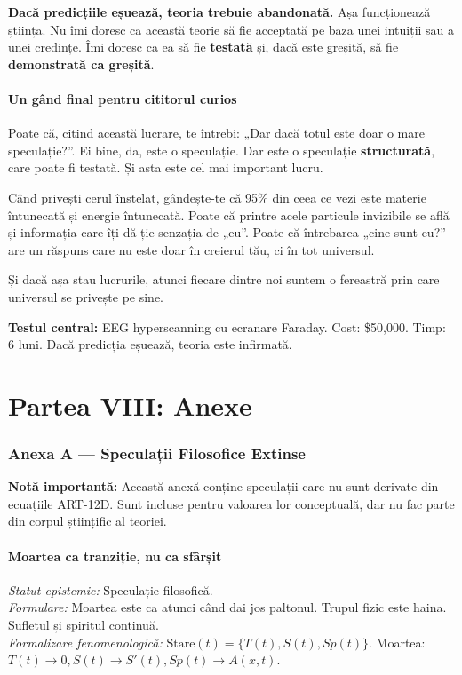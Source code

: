 \documentclass[11pt,a4paper]{article}
\begin{document}
\textbf{Dacă predicțiile eșuează, teoria trebuie abandonată.} Așa funcționează știința. Nu îmi doresc ca această teorie să fie acceptată pe baza unei intuiții sau a unei credințe. Îmi doresc ca ea să fie \textbf{testată} și, dacă este greșită, să fie \textbf{demonstrată ca greșită}.

\subsection{Un gând final pentru cititorul curios}
Poate că, citind această lucrare, te întrebi: „Dar dacă totul este doar o mare speculație?”. Ei bine, da, este o speculație. Dar este o speculație \textbf{structurată}, care poate fi testată. Și asta este cel mai important lucru.

Când privești cerul înstelat, gândește-te că 95\% din ceea ce vezi este materie întunecată și energie întunecată. Poate că printre acele particule invizibile se află și informația care îți dă ție senzația de „eu”. Poate că întrebarea „cine sunt eu?” are un răspuns care nu este doar în creierul tău, ci în tot universul.

Și dacă așa stau lucrurile, atunci fiecare dintre noi suntem o fereastră prin care universul se privește pe sine.

\textbf{Testul central:} EEG hyperscanning cu ecranare Faraday. Cost: \$50,000. Timp: 6 luni. Dacă predicția eșuează, teoria este infirmată.

\newpage
\part*{Partea VIII: Anexe}

\section{Anexa A — Speculații Filosofice Extinse}
\textbf{Notă importantă:} Această anexă conține speculații care nu sunt derivate din ecuațiile ART-12D. Sunt incluse pentru valoarea lor conceptuală, dar nu fac parte din corpul științific al teoriei.

\subsection{Moartea ca tranziție, nu ca sfârșit}
\textit{Statut epistemic:} Speculație filosofică. \\
\textit{Formulare:} Moartea este ca atunci când dai jos paltonul. Trupul fizic este haina. Sufletul și spiritul continuă. \\
\textit{Formalizare fenomenologică:} $\text{Stare}(t) = \{ T(t), S(t), Sp(t) \}$. Moartea: $T(t) \to 0, S(t) \to S'(t), Sp(t) \to A(x,t)$.
\end{document}
